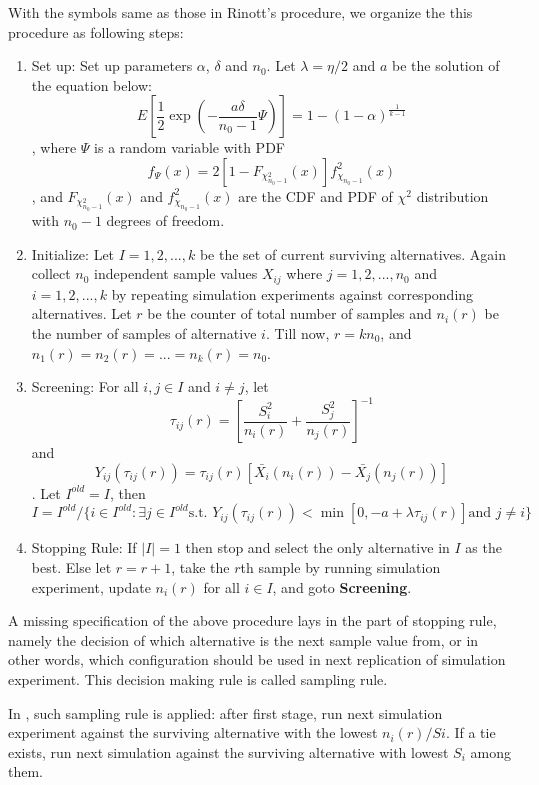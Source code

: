 \documentclass[12pt,a4paper]{report}
\begin{document}
With the symbols same as those in Rinott's procedure, we organize the this procedure as following steps:

\begin{enumerate}
\item{Set up: } Set up parameters $\alpha$, $\delta$ and $n_0$. Let $\lambda = \eta / 2$ and $a$ be the solution of the equation below:
$$ E[\frac{1}{2}\exp(- \frac{a\delta}{n_0 - 1} \Psi)] = 1 - (1 - \alpha)^{\frac{1}{k - 1}} $$,
where $\Psi$ is a random variable with PDF
$$ f_{\Psi}(x) = 2 [1 - F_{\chi_{n_0 - 1}^2}(x)] f_{\chi_{n_0 - 1}}^2(x) $$,
and $F_{\chi_{n_0 - 1}^2}(x)$ and $f_{\chi_{n_0 - 1}}^2(x)$ are the CDF and PDF of $\chi^2$ distribution with $n_0 - 1$ degrees of freedom.
\item{Initialize: } Let $I = {1, 2,...,k}$ be the set of current surviving alternatives. Again collect $n_0$ independent sample values $X_{ij}$ where $j = 1, 2,...,n_0$ and $i = 1, 2,...,k$ by repeating simulation experiments against corresponding alternatives. Let $r$ be the counter of total number of samples and $n_i(r)$ be the number of samples of alternative $i$. Till now, $r = kn_0$, and $n_1(r) = n_2(r) = ... = n_k(r) = n_0$.
\item{Screening: } For all $i,j \in I$ and $i \neq j$, let 
$$ \tau_{ij}(r) = [\frac{S_i^2}{n_i(r)} + \frac{S_j^2}{n_j(r)}]^{-1} $$
and
$$ Y_{ij}(\tau_{ij}(r)) = \tau_{ij}(r)[\bar{X_i}(n_i(r)) - \bar{X_j}(n_j(r))] $$.
Let $I^{old} = I$, then
$$ I = I^{old}/\{i \in I^{old}: \exists j \in I^{old} \text{s.t. } Y_{ij}(\tau_{ij}(r)) < \min[0, - a + \lambda \tau_{ij}(r)]  \text{and } j \neq i\} $$
\item{Stopping Rule: } If $|I| = 1$ then stop and select the only alternative in $I$ as the best. Else let $r = r + 1$, take the $r$th sample by running simulation experiment, update $n_i(r)$ for all $i \in I$, and goto \textbf{Screening}.
\end{enumerate}

A missing specification of the above procedure lays in the part of stopping rule, namely the decision of which alternative is the next sample value from, or in other words, which configuration should be used in next replication of simulation experiment. This decision making rule is called sampling rule.

In \cite{ras-seq-jeff}, such sampling rule is applied: after first stage, run next simulation experiment against the surviving alternative with the lowest $n_i(r)/Si$. If a tie exists, run next simulation against the surviving alternative with lowest $S_i$ among them.
\end{document}
